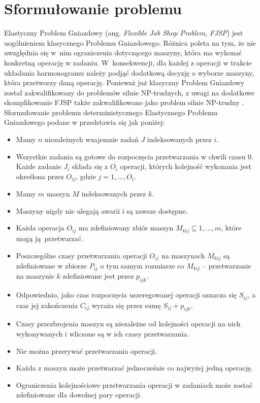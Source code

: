 \documentclass[archivemode]{mgr}
\begin{document}
\chapter{Sformułowanie problemu \label{ch_problem_def}}
Elastyczny Problem Gniazdowy (ang. \emph{Flexible Job Shop Problem}, \emph{FJSP}) jest uogólnieniem klasycznego Problemu Gniazdowego. Różnica poleta na tym, że nie uwzględnia się w~nim ograniczenia dotyczącego maszyny, która ma wykonać konkretną operację w zadaniu. W~konsekwencji, dla każdej z operacji w trakcie układania harmonogramu należy podjąć dodatkową decyzję o wyborze maszyny, która przetworzy daną operację. Ponieważ już klasyczny Problem Gniazdowy został zakwalifikowany do problemów silnie NP-trudnych, z uwagi na dodatkowe skomplikowanie FJSP także zakwalifikowano jako problem silnie NP-trudny \cite{Tay2004}. Sformułowanie problemu deterministycznego Elastycznego Problemu Gniazdowego podane w \cite{AEHGAFJS_ElMekkawy11} przedstawia się jak poniżej:
\begin{itemize}
    \item Mamy $n$ niezależnych wzajemnie zadań $J$ indeksowanych przez $i$.
    \item Wszystkie zadania są gotowe do rozpoczęcia przetwarzania w chwili czasu 0.
    Każde zadanie $J_i$ składa się z $O_i$ operacji, których kolejność wykonania jest określona przez $O_{ij}$, gdzie $j = 1, ..., O_i$.
    \item Mamy $m$ maszyn $M$ indeksowanych przez $k$.
    \item Maszyny nigdy nie ulegają awarii i są zawsze dostępne.
    \item Każda operacja $O_{ij}$ ma zdefiniowany zbiór maszyn $M_{kij} \subseteq {1, ..., m}$, które mogą ją~przetwarzać.
    \item Poszczególne czasy przetwarzania operacji $O_{ij}$ na maszynach $M_{kij}$ są zdefiniowane w zbiorze $P_{ij}$ o tym samym rozmiarze co $M_{kij}$ -- przetwarzanie na maszynie $k$ zdefiniowane jest przez $p_{ijk}$.
    \item Odpowiednio, jako czas rozpoczęcia uszeregowanej operacji oznacza się $S_{ij}$, a czas jej zakończenia $C_{ij}$ wyraża się przez sumę $S_{ij} + p_{ijk}$.
    \item Czasy przezbrojenia maszyn są niezależne od kolejności operacji na nich wykonywanych i wliczone są w ich czasy przetwarzania.
    \item Nie można przerywać przetwarzania operacji.
    \item Każda z maszyn może przetwarzać jednocześnie co najwyżej jedną operację.
    \item Ograniczenia kolejnościowe przetwarzania operacji w zadaniach może zostać zdefiniowane dla dowolnej pary operacji.
\end{itemize}
\end{document}
